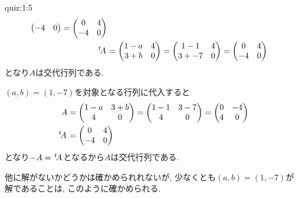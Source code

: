\begin{answerof}{quiz:1:5}
\begin{align*}
\begin{pmatrix}
      -4  &0
    \end{pmatrix}
    =
    \begin{pmatrix}
      0& 4\\
      -4  &0
    \end{pmatrix}\\    
    {\left.^{t}\!A\right.}&=
    \begin{pmatrix}
      1-a& 4\\
      3+b &0
    \end{pmatrix}
    =
      \begin{pmatrix}
      1-1& 4\\
      3+-7 &0
    \end{pmatrix}
    =
      \begin{pmatrix}
      0& 4\\
      -4 &0
    \end{pmatrix}
\end{align*}
となり$A$は交代行列である.  
\end{answerof}
\begin{checkanswer}%
$(a,b)=(1,-7)$を対象となる行列に代入すると
  \begin{align*}
    A&=
    \begin{pmatrix}
      1-a& 3+b\\
      4  &0
    \end{pmatrix}
    =
    \begin{pmatrix}
      1-1& 3-7\\
      4  &0
    \end{pmatrix}
    =
    \begin{pmatrix}
      0& -4\\
      4  &0
    \end{pmatrix}\\    
    {\left.^{t}\!A\right.}&=
    \begin{pmatrix}
      0& 4\\
     -4 &0
    \end{pmatrix}
\end{align*}
となり$-A={\left.^{t}\!A\right.}$となるから$A$は交代行列である.  

他に解がないかどうかは確かめられれないが,
少なくとも$(a,b)=(1,-7)$が解であることは,
このように確かめられる.
\end{checkanswer}

